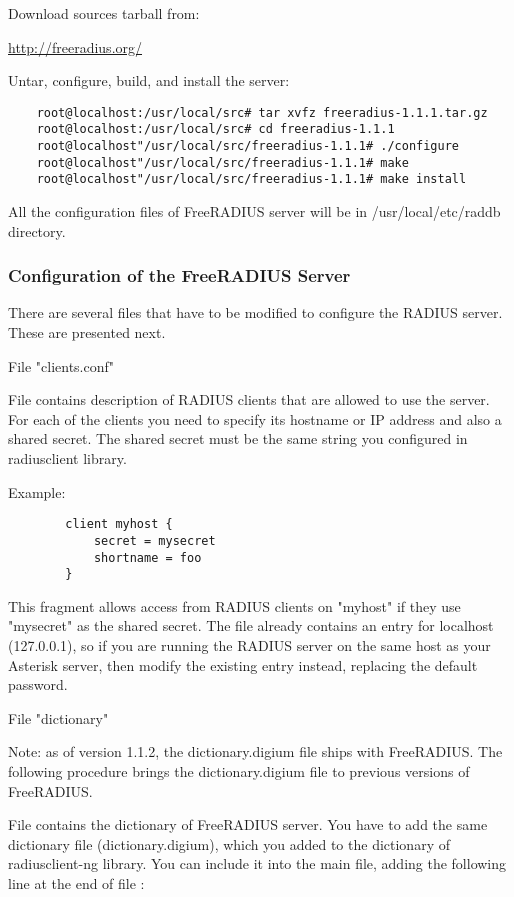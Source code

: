 	Download sources tarball from:

		\url{http://freeradius.org/}
			
	Untar, configure, build, and install the server:

\begin{verbatim}
	root@localhost:/usr/local/src# tar xvfz freeradius-1.1.1.tar.gz
	root@localhost:/usr/local/src# cd freeradius-1.1.1
	root@localhost"/usr/local/src/freeradius-1.1.1# ./configure
	root@localhost"/usr/local/src/freeradius-1.1.1# make
	root@localhost"/usr/local/src/freeradius-1.1.1# make install
\end{verbatim}

	All the configuration files of FreeRADIUS server will be in
	/usr/local/etc/raddb directory.
		

\subsubsection{Configuration of the FreeRADIUS Server}
			
	There are several files that have to be modified to configure the
	RADIUS server. These are presented next.

	File "clients.conf"
			
	File  contains description of
	RADIUS clients that are allowed to use the server. For each of the
	clients you need to specify its hostname or IP address and also a
	shared secret. The shared secret must be the same string you configured
	in radiusclient library.

	Example:
\begin{verbatim}
		client myhost {
		    secret = mysecret
		    shortname = foo
		}
\end{verbatim}	

	This fragment allows access from RADIUS clients on "myhost" if they use
	"mysecret" as the shared secret.	
	The file already contains an entry for localhost (127.0.0.1), so if you
	are running the RADIUS server on the same host as your Asterisk server,
	then modify the existing entry instead, replacing the default password.
		
	File "dictionary"
		
	Note: as of version 1.1.2, the dictionary.digium file ships with FreeRADIUS.
	The following procedure brings the dictionary.digium file to previous versions
	of FreeRADIUS.
	
	File  contains the dictionary of
	FreeRADIUS server. You have to add the same dictionary file
	(dictionary.digium), which you added to the dictionary of radiusclient-ng
	library. You can include it into the main file, adding the following line at the
	end of file :
		
